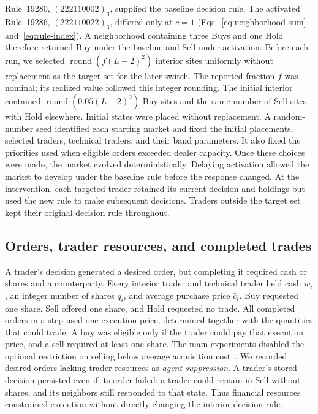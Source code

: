Rule~19280, $(222110002)_3$, supplied the baseline decision rule.
The activated Rule~19286, $(222110022)_3$, differed only at $c=1$
(Eqs.~\ref{eq:neighborhood-sum} and~\ref{eq:rule-index}).
A neighborhood containing three Buys and one Hold therefore returned Buy
under the baseline and Sell under activation. Before each run, we selected
$\operatorname{round}(f(L-2)^2)$ interior sites uniformly without replacement
as the target set for the later switch. The reported fraction $f$ was
nominal; its realized value followed this integer rounding. The initial interior contained
$\operatorname{round}(0.05(L-2)^2)$ Buy sites and the same number of Sell
sites, with Hold elsewhere. Initial states were placed without replacement.
A random-number seed identified each starting market and fixed the
initial placements, selected traders, technical traders, and their
band parameters. It also fixed the priorities used
when eligible orders exceeded dealer capacity. Once these choices were
made, the market evolved deterministically. Delaying activation allowed
the market to develop under the baseline rule before the response changed.
At the intervention, each targeted trader retained its current decision
and holdings but used the new rule to make subsequent decisions. Traders
outside the target set kept their original decision rule throughout.

\subsection{Orders, trader resources, and completed trades}

A trader's decision generated a desired order, but completing it required
cash or shares and a counterparty. Every interior trader and technical
trader held cash $w_i$, an integer number of shares $q_i$, and average
purchase price $\bar c_i$. Buy requested one share, Sell offered one share,
and Hold requested no trade. All completed orders in a step used one
execution price, determined together with the quantities that could
trade. A buy was eligible only if the trader could pay that execution
price, and a sell required at least one share. The main experiments
disabled the optional restriction on selling below average acquisition
cost~\cite{shefrin1985disposition,odean1998investors}. We recorded desired
orders lacking trader resources as \emph{agent suppression}. A trader's
stored decision persisted even if its order failed: a trader could remain
in Sell without shares, and its neighbors still responded to that state.
Thus financial resources constrained execution without directly changing
the interior decision rule.


